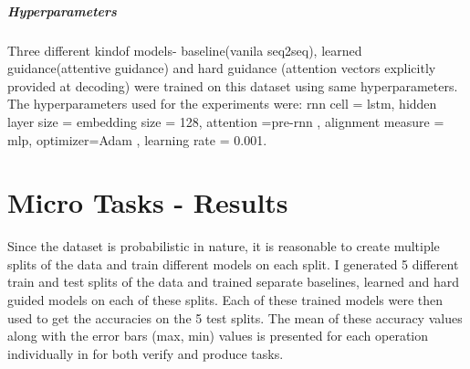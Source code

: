\subparagraph{Hyperparameters} Three different kindof models- baseline(vanila seq2seq), learned guidance(attentive guidance) and hard guidance (attention vectors explicitly provided at decoding) were trained on this dataset using same hyperparameters. The hyperparameters used for the experiments were: rnn cell = lstm, hidden layer size = embedding size = 128, attention =pre-rnn \citep{Bahdanau2014}, alignment measure = mlp, optimizer=Adam \citep{KingmaB14}, learning rate = 0.001.

\section{Micro Tasks - Results}
Since the dataset is probabilistic in nature, it is reasonable to create multiple splits of the data and train different models on each split. I generated 5 different train and test splits of the data and trained separate baselines, learned and hard guided models on each of these splits. Each of these trained models were then used to get the accuracies on the 5 test splits. The mean of these accuracy values along with the error bars (max, min) values is presented for each operation individually in for both verify and produce tasks.

